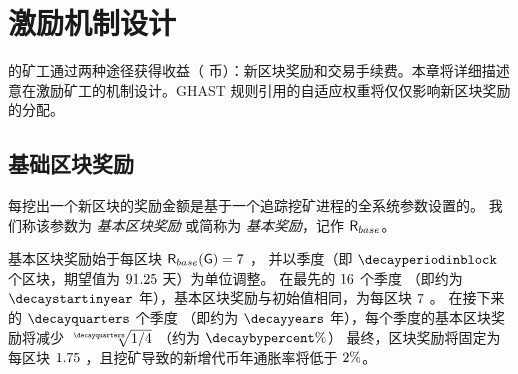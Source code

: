 
\section{激励机制设计}
\label{sec:incentive}

{\name} 的矿工通过两种途径获得收益（ {\name} 币）：新区块奖励和交易手续费。本章将详细描述 {\name} 意在激励矿工的机制设计。GHAST 规则引用的自适应权重将仅仅影响新区块奖励的分配。




\subsection{基础区块奖励}
\label{subsec:baseaward}
每挖出一个新区块的奖励金额是基于一个追踪挖矿进程的全系统参数设置的。
我们称该参数为 \emph{基本区块奖励} 或简称为 \emph{基本奖励}，记作 $\textsf{R}_{base}$。


基本区块奖励始于每区块 $\textsf{R}_{base}(\textsf{G}) = 7$ \coinsign，
并以季度（即 $\decayperiodinblock$ 个区块，期望值为 $91.25$ 天）为单位调整。
在最先的 $16$	个季度 （即约为 $\decaystartinyear$ 年），基本区块奖励与初始值相同，为每区块 $7$ \coinsign。 
在接下来的 $\decayquarters$ 个季度 （即约为 $\decayyears$ 年），每个季度的基本区块奖励将减少 $\sqrt[\decayquarters]{1/4}$ （约为 $\decaybypercent\%$）
最终，区块奖励将固定为每区块 $1.75$ \coinsign，且挖矿导致的新增代币年通胀率将低于 $2\%$。

